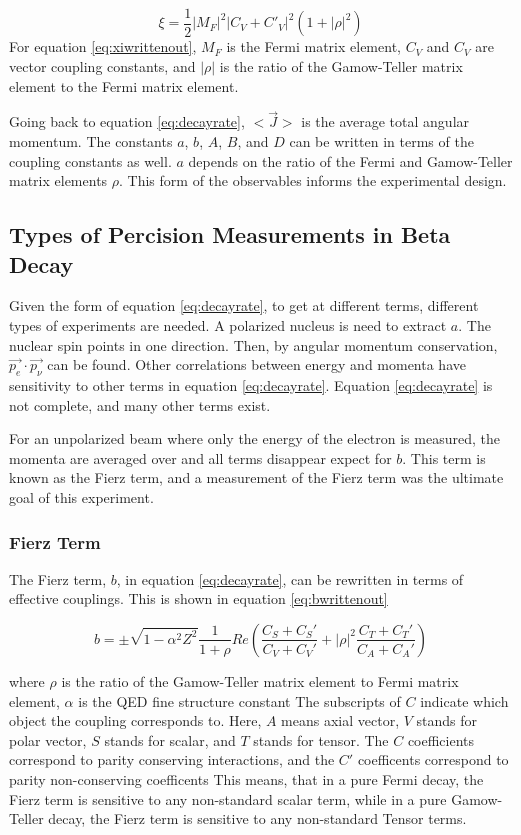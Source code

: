 \documentclass[main.tex]{subfiles}
\begin{document}
\begin{equation}
	\xi = \frac{1}{2} |M_{F}|^{2} |C_{V} + C'_{V}|^{2} (1 + |\rho|^{2})
	\label{eq:xiwrittenout}
\end{equation}
For equation \ref{eq:xiwrittenout}, $M_{F}$ is the Fermi matrix element, $C_{V}$ and $C_{V}$ are vector coupling constants, and $|\rho|$ is the ratio of the Gamow-Teller matrix element to the Fermi matrix element.
\cite{Gon19}

Going back to equation \ref{eq:decayrate}, $<\vec{J}>$ is the average total angular momentum. 
The constants $a$, $b$, $A$, $B$, and $D$ can be written in terms of the coupling constants as well.
$a$ depends on the ratio of the Fermi and Gamow-Teller matrix elements $\rho$.
This form of the observables informs the experimental design. 

\subsection{Types of Percision Measurements in Beta Decay}
Given the form of equation \ref{eq:decayrate}, to get at different terms, different types of experiments are needed.
A polarized nucleus is need to extract $a$. 
The nuclear spin points in one direction. 
Then, by angular momentum conservation, $\vec{p_{e}} \cdot \vec{p_{\nu}}$ can be found.
Other correlations between energy and momenta have sensitivity to other terms in equation \ref{eq:decayrate}.
Equation \ref{eq:decayrate} is not complete, and many other terms exist. 

For an unpolarized beam where only the energy of the electron is measured, the momenta are averaged over and all terms disappear expect for $b$.
This term is known as the Fierz term, and a measurement of the Fierz term was the ultimate goal of this experiment. 

\subsubsection{Fierz Term}
The Fierz term, $b$, in equation \ref{eq:decayrate}, can be rewritten in terms of effective couplings.
This is shown in equation \ref{eq:bwrittenout}

\begin{equation}
	b =  \pm \sqrt{1 - \alpha^{2}{Z^{2}}}\frac{1}{1 + \rho}Re(\frac{C_{S} + C_{S}'}{C_{V} + C_{V}'} + |\rho|^{2}\frac{C_{T} + C_{T}'}{C_{A} + C_{A}'})
	\label{eq:bwrittenout}
\end{equation}

where $\rho$ is the ratio of the Gamow-Teller matrix element to Fermi matrix element, $\alpha$ is the QED fine structure constant \cite{Gon19}
The subscripts of $C$ indicate which object the coupling corresponds to. 
Here, $A$ means axial vector, $V$ stands for polar vector, $S$ stands for scalar, and $T$ stands for tensor. 
The $C$ coefficients correspond to parity conserving interactions, and the $C'$ coefficents correspond to parity non-conserving coefficents \cite{Lee56}
This means, that in a pure Fermi decay, the Fierz term is sensitive to any non-standard scalar term, while in a pure Gamow-Teller decay, the Fierz term is sensitive to any non-standard Tensor terms. 
\end{document}
